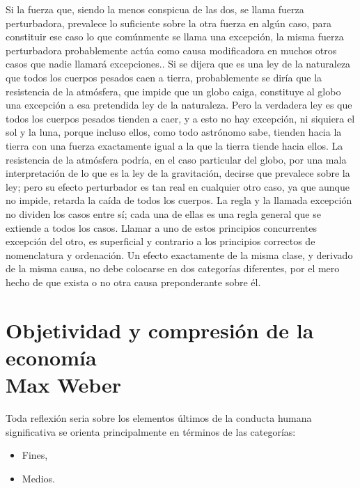 Si la fuerza que, siendo la menos conspicua de las dos, se llama fuerza perturbadora, prevalece lo suficiente sobre la otra fuerza en algún caso, para constituir ese caso lo que comúnmente se llama una excepción, la misma fuerza perturbadora probablemente actúa como causa modificadora en muchos otros casos que nadie llamará excepciones.. Si se dijera que es una ley de la naturaleza que todos los cuerpos pesados caen a tierra, probablemente se diría que la resistencia de la atmósfera, que impide que un globo caiga, constituye al globo una excepción a esa pretendida ley de la naturaleza. Pero la verdadera ley es que todos los cuerpos pesados tienden a caer, y a esto no hay excepción, ni siquiera el sol y la luna, porque incluso ellos, como todo astrónomo sabe, tienden hacia la tierra con una fuerza exactamente igual a la que la tierra tiende hacia ellos. La resistencia de la atmósfera podría, en el caso particular del globo, por una mala interpretación de lo que es la ley de la gravitación, decirse que prevalece sobre la ley; pero su efecto perturbador es tan real en cualquier otro caso, ya que aunque no impide, retarda la caída de todos los cuerpos. La regla y la llamada excepción no dividen los casos entre sí; cada una de ellas es una regla general que se extiende a todos los casos. Llamar a uno de estos principios concurrentes excepción del otro, es superficial y contrario a los principios correctos de nomenclatura y ordenación. Un efecto exactamente de la misma clase, y derivado de la misma causa, no debe colocarse en dos categorías diferentes, por el mero hecho de que exista o no otra causa preponderante sobre él.


\chapter{Objetividad y compresión de la economía \\ Max Weber}

Toda reflexión seria sobre los elementos últimos de la conducta humana significativa se orienta principalmente en términos de las categorías:

\begin{itemize}
    \item Fines,
    \item Medios.
\end{itemize}

